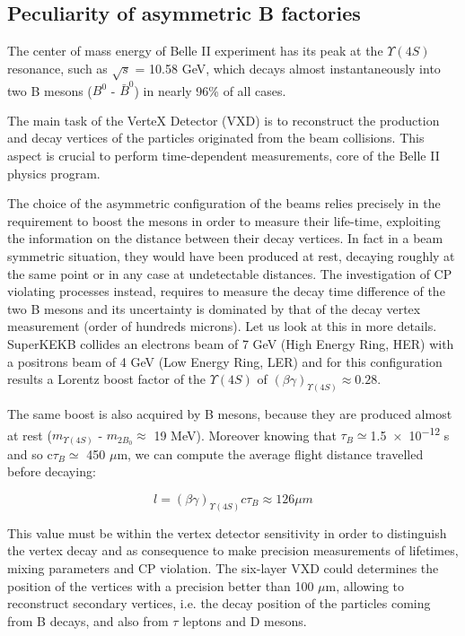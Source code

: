
\subsection{Peculiarity of asymmetric B factories} \label{sec:vertex_decay}

The center of mass energy of Belle II experiment has its peak at the $\Upsilon(4S)$ resonance, such as $\sqrt{s}$ = 10.58 GeV, which decays almost instantaneously into two B mesons ($B^{0}$ - $\bar{B}^{0}$) in nearly 96\% of all cases. 

The main task of the VerteX Detector (VXD) is to reconstruct the production and decay vertices of the particles originated from the beam collisions. This aspect is crucial to perform time-dependent measurements, core of the Belle II physics program.

The choice of the asymmetric configuration of the beams relies precisely in the requirement to boost the mesons in order to measure their life-time, exploiting the information on the distance between their decay vertices. In fact in a beam symmetric situation, they would have been produced at rest, decaying roughly at the same point or in any case at undetectable distances. 
The investigation of CP violating processes instead, requires to measure the decay time difference of the two B mesons and its uncertainty is dominated by that of the decay vertex measurement (order of hundreds microns). Let us look at this in more details.\\

SuperKEKB collides an electrons beam of 7 GeV (High Energy Ring, HER) with a positrons beam of 4 GeV (Low Energy Ring, LER) and for this configuration results a Lorentz boost factor of the $\Upsilon(4S)$ of $(\beta\gamma)_{\Upsilon(4S)} \approx 0.28 $.

The same boost is also acquired by B mesons, because they are produced almost at rest ($m_{\Upsilon(4S)}$ - $m_{2B_{0}}\approx$ 19 MeV). Moreover knowing that $\tau_{B}\simeq $\num{1.5e-12} s and so c$\tau_{B}\simeq$ 450 $\mu$m, we can compute the average flight distance travelled before decaying:

\begin{equation}
\textit{l} = (\beta\gamma)_{\Upsilon(4S)}c\tau_{B} \approx 126 \mu m  
\end{equation} 

This value must be within the vertex detector sensitivity in order to distinguish the vertex decay and as consequence to make precision measurements of lifetimes, mixing parameters and CP violation. The six-layer VXD could determines the position of the vertices with a precision better than 100 $\mu$m, allowing to reconstruct secondary vertices, i.e. the decay position of the particles coming from B decays, and also from $\tau$ leptons and D mesons.

